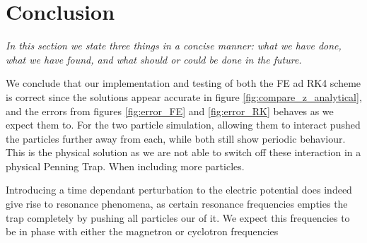\section{Conclusion}\label{sec:conclusion}
\textit{In this section we state three things in a concise manner: what we have done, what we have found, and what should or could be done in the future.}

We conclude that our implementation and testing of both the FE ad RK4 scheme is correct since the solutions appear accurate in figure \ref{fig:compare_z_analytical}, and the errors from figures \ref{fig:error_FE} and \ref{fig:error_RK} behaves as we expect them to. For the two particle simulation, allowing them to interact pushed the particles further away from each, while both still show periodic behaviour. This is the physical solution as we are not able to switch off these interaction in a physical Penning Trap. When including more particles. 

Introducing a time dependant perturbation to the electric potential does indeed give rise to resonance phenomena, as certain resonance frequencies empties the trap completely by pushing all particles our of it. We expect this frequencies to be in phase with either the magnetron or cyclotron frequencies 
